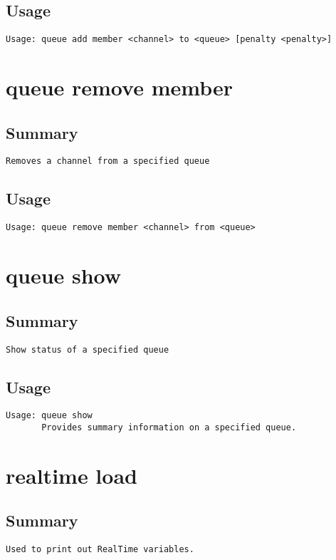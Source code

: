 \subsection{Usage}
\begin{verbatim}
Usage: queue add member <channel> to <queue> [penalty <penalty>]

\end{verbatim}


\section{queue remove member}
\subsection{Summary}
\begin{verbatim}
Removes a channel from a specified queue
\end{verbatim}
\subsection{Usage}
\begin{verbatim}
Usage: queue remove member <channel> from <queue>

\end{verbatim}


\section{queue show}
\subsection{Summary}
\begin{verbatim}
Show status of a specified queue
\end{verbatim}
\subsection{Usage}
\begin{verbatim}
Usage: queue show
       Provides summary information on a specified queue.

\end{verbatim}


\section{realtime load}
\subsection{Summary}
\begin{verbatim}
Used to print out RealTime variables.
\end{verbatim}
